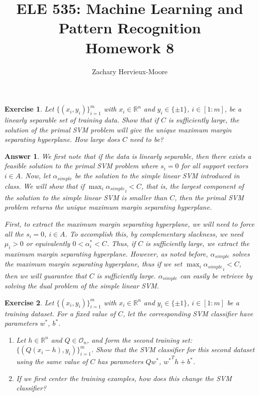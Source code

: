 \documentclass[12pt]{article}
\title{ELE 535: Machine Learning and Pattern Recognition \\ Homework 8}
\author{Zachary Hervieux-Moore}
\date{\displaydate{date}}
\theoremstyle{colon}
\newtheorem{exercise}{Exercise}
\newtheorem*{answer}{Answer}
\begin{document}
\maketitle

\clearpage

\begin{exercise}
  Let $\{(x_i, y_i)\}_{i=1}^m$ with $x_i \in \mathbb{R}^n$ and $y_i \in \{\pm 1\}$, $i \in [1:m]$, be a linearly separable set of training data. Show that if $C$ is sufficiently large, the solution of the primal SVM problem will give the unique maximum margin separating hyperplane. How large does $C$ need to be?
\end{exercise}

\begin{answer}
  We first note that if the data is linearly separable, then there exists a feasible solution to the primal SVM problem where $s_i = 0$ for all support vectors $i \in A$. Now, let $\alpha_{simple}$ be the solution to the simple linear SVM introduced in class. We will show that if $\max_i {\alpha_{simple}}_i < C$, that is, the largest component of the solution to the simple linear SVM is smaller than $C$, then the primal SVM problem returns the unique maximum margin separating hyperplane.

  First, to extract the maximum margin separating hyperplane, we will need to force all the $s_i = 0$, $i \in A$. To accomplish this, by complementary slackness, we need $\mu_i > 0$ or equivalently $0 < \alpha_i^* < C$. Thus, if $C$ is sufficiently large, we extract the maximum margin separating hyperplane. However, as noted before, $\alpha_{simple}$ solves the maximum margin separating hyperplane, thus if we set $\max_i {\alpha_{simple}}_i < C$, then we will guarantee that $C$ is sufficiently large. $\alpha_{simple}$ can easily be retrieve by solving the dual problem of the simple linear SVM.
\end{answer}

\clearpage

\begin{exercise}
  Let $\{(x_i, y_i)\}_{i=1}^m$ with $x_i \in \mathbb{R}^n$ and $y_i \in \{\pm 1\}$, $i \in [1:m]$ be a training dataset. For a fixed value of $C$, let the corresponding SVM classifier have parameters $w^*$, $b^*$.

  \begin{enumerate}[label=\alph*)]
    \item Let $h \in \mathbb{R}^n$ and $Q \in \mathcal{O}_n$, and form the second training set: $\{(Q(x_i - h), y_i) \}_{i=1}^m$. Show that the SVM classifier for this second dataset using the same value of $C$ has parameters $Q w^*$, ${w^*}^T h + b^*$.

    \item If we first center the training examples, how does this change the SVM classifier?
  \end{enumerate}
\end{exercise}
\end{document}
